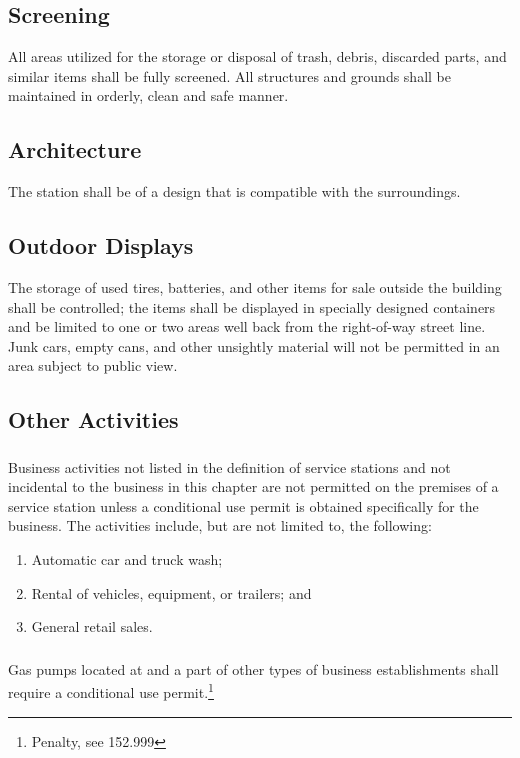 \subsection{Screening}
All areas utilized for the storage or disposal of trash, debris, discarded parts, and similar items shall be fully screened.  All structures and grounds shall be maintained in orderly, clean and safe manner.
\subsection{Architecture}
The station shall be of a design that is compatible with the surroundings.
\subsection{Outdoor Displays}
The storage of used tires, batteries, and other items for sale outside the building shall be controlled; the items shall be displayed in specially designed containers and be limited to one or two areas well back from the right-of-way street line. Junk cars, empty cans, and other unsightly material will not be permitted in an area subject to public view.
\subsection{Other Activities}
\subsubsection{}
Business activities not listed in the definition of service stations and not incidental to the business in this chapter are not permitted on the premises of a service station unless a conditional use permit is obtained specifically for the business. The activities include, but are not limited to, the following:
\begin{enumerate}[{\indent}a)]
    \item Automatic car and truck wash; 
    \item Rental of vehicles, equipment, or trailers; and 
    \item General retail sales.
\end{enumerate}
\subsubsection{}
Gas pumps located at and a part of other types of business establishments shall require a conditional use permit.\footnote{Penalty, see 152.999}


